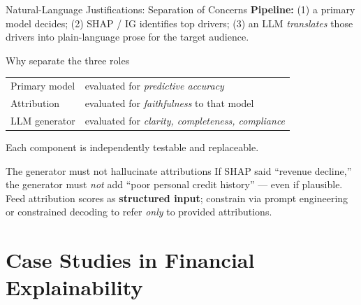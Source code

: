 \documentclass[9pt,t]{beamer}
\begin{document}
\begin{frame}{Natural-Language Justifications: Separation of Concerns}
\textbf{Pipeline:} (1) a primary model decides; (2) SHAP / IG identifies top
drivers; (3) an LLM \emph{translates} those drivers into plain-language prose for
the target audience.

\medskip
\begin{block}{Why separate the three roles}
\begin{tabular}{ll}
Primary model & evaluated for \emph{predictive accuracy} \\
Attribution & evaluated for \emph{faithfulness} to that model \\
LLM generator & evaluated for \emph{clarity, completeness, compliance} \\
\end{tabular}
Each component is independently testable and replaceable.
\end{block}

\medskip
\begin{alertblock}{The generator must not hallucinate attributions}
If SHAP said ``revenue decline,'' the generator must \emph{not} add ``poor
personal credit history'' --- even if plausible. Feed attribution scores as
\textbf{structured input}; constrain via prompt engineering or constrained
decoding to refer \emph{only} to provided attributions.
\end{alertblock}
\end{frame}

\section{Case Studies in Financial Explainability}
\end{document}
